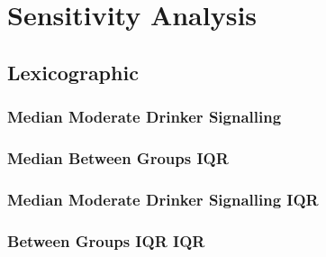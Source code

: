 \section{Sensitivity Analysis}
\label{app:sensitivity_results}

\subsection{Lexicographic}

\subsubsection{Median Moderate Drinker Signalling}

\subsubsection{Median Between Groups IQR}

\subsubsection{Median Moderate Drinker Signalling IQR}

\subsubsection{Between Groups IQR IQR}